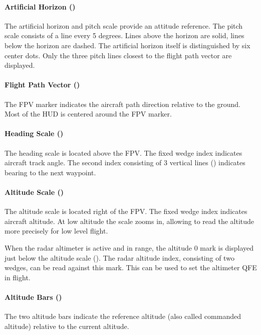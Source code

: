 \paragraph{Artificial Horizon ()}
The artificial horizon and pitch scale provide an attitude reference.
The pitch scale consists of a line every 5 degrees.
Lines above the horizon are solid, lines below the horizon are dashed.
The artificial horizon itself is distinguished by six center dots.
Only the three pitch lines closest to the flight path vector are displayed.

\paragraph{Flight Path Vector ()}
The FPV marker indicates the aircraft path direction relative to the ground.
Most of the HUD is centered around the FPV marker.

\paragraph{Heading Scale ()}
The heading scale is located above the FPV.
The fixed wedge index indicates aircraft track angle.
The second index consisting of 3 vertical lines
() indicates bearing to the next waypoint.

\paragraph{Altitude Scale ()}
The altitude scale is located right of the FPV.
The fixed wedge index indicates aircraft altitude.
At low altitude the scale zooms in,
allowing to read the altitude more precisely for low level flight.

When the radar altimeter is active and in range,
the altitude 0 mark is displayed just below the altitude scale
().
The radar altitude index, consisting of two wedges, can be read against this mark.
This can be used to set the altimeter QFE in flight.

\paragraph{Altitude Bars ()}
The two altitude bars indicate the reference altitude
(also called commanded altitude) relative to the current altitude.

